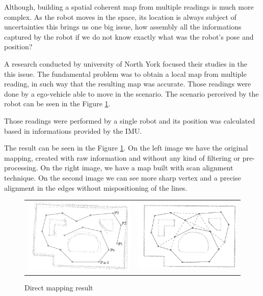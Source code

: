 Although, building a spatial coherent map from multiple readings is much more complex. As the robot moves in the space, its location is always subject of uncertainties this brings us one big issue, how assembly all the informations captured by the robot if we do not know exactly what was the robot's pose and position? 

A research conducted by university of North York\cite{Lu:1997:GCR:591441.591464} focused their studies in the this issue. The fundamental problem was to obtain a local map from multiple reading, in such way that the resulting map was accurate. Those readings were done by a ego-vehicle able to move in the scenario. The scenario perceived by the robot can be seen in the Figure \ref{fig:mapping:direct:result}.

Those readings were performed by a single robot and its position was calculated based in informations provided by the IMU.

The result can be seen in the Figure \ref{fig:mapping:direct:result}. On the left image we have the original mapping, created with raw information and without any kind of filtering or pre-processing. On the right image, we have a map built with scan alignment technique\cite{Lu:1997:GCR:591441.591464}. On the second image we can see more sharp vertex and a precise alignment in the edges without mispositioning of the lines.

\begin{figure}[h]
\centering
	\begin{tabular}{lr}\\
		\includegraphics[width=0.5\columnwidth]{img/fig:mapping:direct:a} &
		\includegraphics[width=0.5\columnwidth]{img/fig:mapping:direct:b}
	\end{tabular}
	\caption{Direct mapping result}
	\label{fig:mapping:direct:result}
\end{figure}


